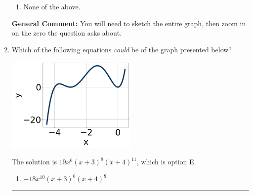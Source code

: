 \documentclass{extbook}[14pt]
\newcommand{\litem}[1]{\item #1

\rule{\textwidth}{0.4pt}}
\begin{document}
\begin{enumerate}
{\begin{enumerate}[label=\Alph*.]
\item None of the above.\end{enumerate}
\textbf{General Comment:} You will need to sketch the entire graph, then zoom in on the zero the question asks about.
}
\litem{
Which of the following equations \textit{could} be of the graph presented below?

\begin{center}
    \includegraphics[width=0.5\textwidth]{../Figures/polyGraphToFunctionCopyC.png}
\end{center}


The solution is \( 19x^{6} (x + 3)^{8} (x + 4)^{11} \), which is option E.\begin{enumerate}[label=\Alph*.]
\item \( -18x^{10} (x + 3)^{6} (x + 4)^{8} \)


\end{enumerate}}
\end{enumerate}
\end{document}
